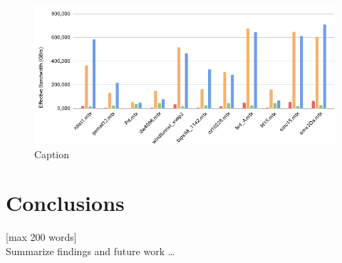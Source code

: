 \documentclass[conference]{IEEEtran}
\begin{document}
\begin{figure}
    \centering
    \includegraphics[width=0.95\linewidth]{SampleImage.png}
    \caption{Caption}
    \label{fig:enter-label}
\end{figure}

\section{Conclusions}
[max 200 words]\\
Summarize findings and future work \dots



\end{document}
